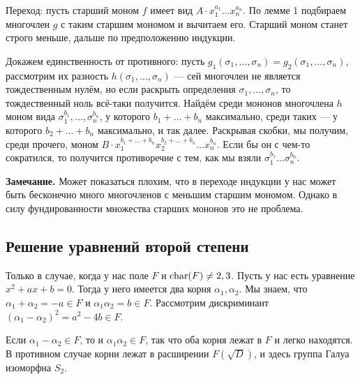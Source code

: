 Переход: пусть старший моном $f$ имеет вид $A \cdot x_1^{a_1} \dots x_n^{a_n}$.
По лемме 1 подбираем многочлен $g$ с таким старшим мономом и вычитаем его.
Старший моном станет строго меньше, дальше по предположению индукции.

Докажем единственность от противного: пусть $g_1(\sigma_1, \dots, \sigma_n) = g_2(\sigma_1, \dots, \sigma_n)$, рассмотрим их разность $h(\sigma_1, \dots, \sigma_n)$ --- сей многочлен не является тождественным нулём, но если раскрыть определения $\sigma_1, \dots, \sigma_n$, то тождественный ноль всё-таки получится.
Найдём среди мононов многочлена $h$ моном вида $\sigma_1^{b_1}, \dots, \sigma_n^{b_n}$, у которого $b_1 + \dots + b_n$ максимально, среди таких --- у которого $b_2 + \dots + b_n$ максимально, и так далее.
Раскрывая скобки, мы получим, среди прочего, моном $B \cdot x_1^{b_1 + \dots + b_n} x_2^{b_2 + \dots + b_n} \dots x_n^{b_n}$.
Если бы он с чем-то сократился, то получится противоречие с тем, как мы взяли $\sigma_1^{b_1} \dots \sigma_n^{b_n}$.

\QED

\textbf{Замечание.} Может показаться плохим, что в переходе индукции у нас может быть бесконечно много многочленов с меньшим старшим мономом.
Однако в силу фундированности множества старших мононов это не проблема.

\subsection{Решение уравнений второй степени}
Только в случае, когда у нас поле $F$ и $\operatorname{char}(F) \ne 2, 3$.
Пусть у нас есть уравнение $x^2 + ax + b = 0$.
Тогда у него имеется два корня $\alpha_1, \alpha_2$.
Мы знаем, что $\alpha_1 + \alpha_2 = -a \in F$ и $\alpha_1 \alpha_2 = b \in F$.
Рассмотрим дискриминант $(\alpha_1 - \alpha_2)^2 = a^2 - 4b \in F$.

Если $\alpha_1 - \alpha_2 \in F$, то и $\alpha_1 \alpha_2 \in F$, так что оба корня лежат в $F$ и легко находятся.
В противном случае корни лежат в расширении $F(\sqrt D)$, и здесь группа Галуа изоморфна $S_2$.

